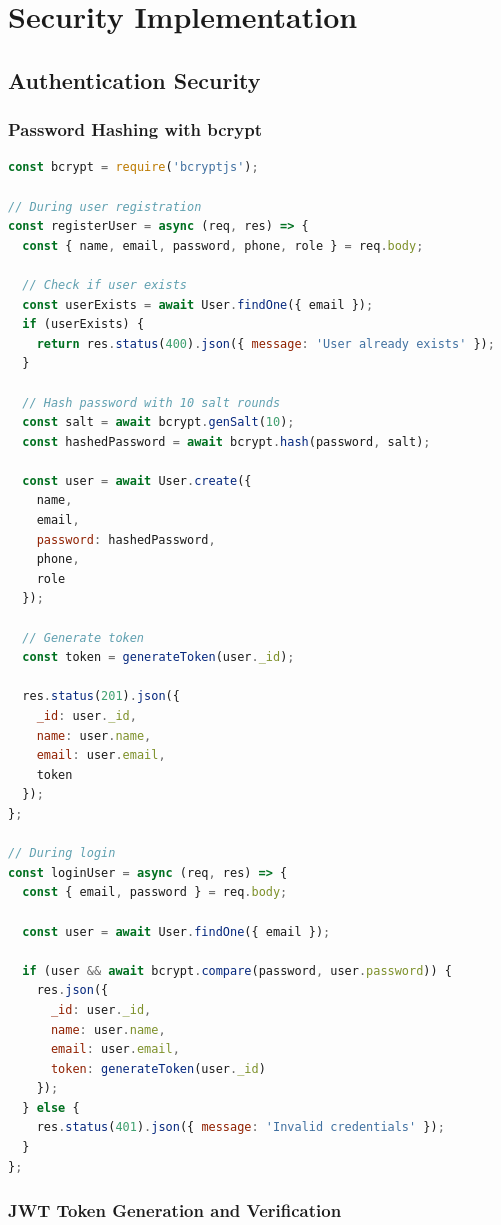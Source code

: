 \documentclass[12pt,a4paper]{article}
\begin{document}
\newpage

\section{Security Implementation}

\subsection{Authentication Security}

\subsubsection{Password Hashing with bcrypt}

\begin{lstlisting}[language=JavaScript, caption=Secure Password Storage]
const bcrypt = require('bcryptjs');

// During user registration
const registerUser = async (req, res) => {
  const { name, email, password, phone, role } = req.body;
  
  // Check if user exists
  const userExists = await User.findOne({ email });
  if (userExists) {
    return res.status(400).json({ message: 'User already exists' });
  }
  
  // Hash password with 10 salt rounds
  const salt = await bcrypt.genSalt(10);
  const hashedPassword = await bcrypt.hash(password, salt);
  
  const user = await User.create({
    name,
    email,
    password: hashedPassword,
    phone,
    role
  });
  
  // Generate token
  const token = generateToken(user._id);
  
  res.status(201).json({
    _id: user._id,
    name: user.name,
    email: user.email,
    token
  });
};

// During login
const loginUser = async (req, res) => {
  const { email, password } = req.body;
  
  const user = await User.findOne({ email });
  
  if (user && await bcrypt.compare(password, user.password)) {
    res.json({
      _id: user._id,
      name: user.name,
      email: user.email,
      token: generateToken(user._id)
    });
  } else {
    res.status(401).json({ message: 'Invalid credentials' });
  }
};
\end{lstlisting}

\subsubsection{JWT Token Generation and Verification}
\end{document}
